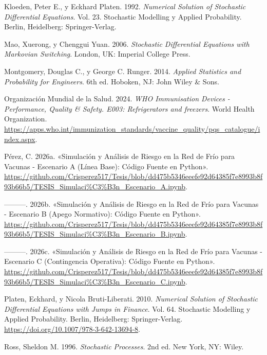 \documentclass[
  spanish,
  letterpaper,
  DIV=11,
  numbers=noendperiod]{scrreprt}
\newlength{\cslhangindent}
\newenvironment{CSLReferences}[2] %
 {\begin{list}{}{%
  \setlength{\itemindent}{0pt}
  \setlength{\leftmargin}{0pt}
  \setlength{\parsep}{0pt}
  \ifodd #1
   \setlength{\leftmargin}{\cslhangindent}
   \setlength{\itemindent}{-1\cslhangindent}
  \fi
  \setlength{\itemsep}{#2\baselineskip}}}
 {\end{list}}
\theoremstyle{plain}
\theoremstyle{plain}
\theoremstyle{plain}
\theoremstyle{definition}
\theoremstyle{remark}
\begin{document}
\begin{CSLReferences}{1}{0}
Kloeden, Peter E., y Eckhard Platen. 1992. \emph{Numerical Solution of
Stochastic Differential Equations}. Vol. 23. Stochastic Modelling y
Applied Probability. Berlin, Heidelberg: Springer-Verlag.

Mao, Xuerong, y Chenggui Yuan. 2006. \emph{Stochastic Differential
Equations with Markovian Switching}. London, UK: Imperial College Press.

Montgomery, Douglas C., y George C. Runger. 2014. \emph{Applied
Statistics and Probability for Engineers}. 6th ed. Hoboken, NJ: John
Wiley \& Sons.

Organización Mundial de la Salud. 2024. \emph{WHO Immunisation Devices -
Performance, Quality \& Safety. E003: Refrigerators and freezers}. World
Health Organization.
\url{https://apps.who.int/immunization_standards/vaccine_quality/pqs_catalogue/index.aspx}.

Pérez, C. 2026a. {«Simulación y Análisis de Riesgo en la Red de Frío
para Vacunas - Escenario A (Línea Base): Código Fuente en Python»}.
\url{https://github.com/Crisperez517/Tesis/blob/dd475b5346eeefe92d64385f7e8993b8f93b66b5/TESIS_Simulaci\%C3\%B3n_Escenario_A.ipynb}.

---------. 2026b. {«Simulación y Análisis de Riesgo en la Red de Frío
para Vacunas - Escenario B (Apego Normativo): Código Fuente en Python»}.
\url{https://github.com/Crisperez517/Tesis/blob/dd475b5346eeefe92d64385f7e8993b8f93b66b5/TESIS_Simulaci\%C3\%B3n_Escenario_B.ipynb}.

---------. 2026c. {«Simulación y Análisis de Riesgo en la Red de Frío
para Vacunas - Escenario C (Contingencia Operativa): Código Fuente en
Python»}.
\url{https://github.com/Crisperez517/Tesis/blob/dd475b5346eeefe92d64385f7e8993b8f93b66b5/TESIS_Simulaci\%C3\%B3n_Escenario_C.ipynb}.

Platen, Eckhard, y Nicola Bruti-Liberati. 2010. \emph{Numerical Solution
of Stochastic Differential Equations with Jumps in Finance}. Vol. 64.
Stochastic Modelling y Applied Probability. Berlin, Heidelberg:
Springer-Verlag. \url{https://doi.org/10.1007/978-3-642-13694-8}.

Ross, Sheldon M. 1996. \emph{Stochastic Processes}. 2nd ed. New York,
NY: Wiley.


\end{CSLReferences}
\end{document}
